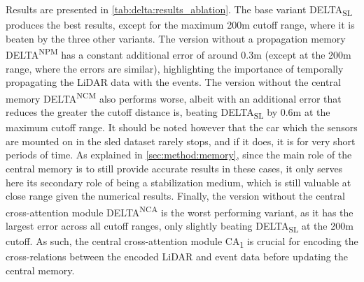 Results are presented in \cref{tab:delta:results_ablation}. The base variant DELTA\textsubscript{SL} produces the best results, except for the maximum 200m cutoff range, where it is beaten by the three other variants. The version without a propagation memory DELTA\textsuperscript{NPM} has a constant additional error of around 0.3m (except at the 200m range, where the errors are similar), highlighting the importance of temporally propagating the LiDAR data with the events. The version without the central memory DELTA\textsuperscript{NCM} also performs worse, albeit with an additional error that reduces the greater the cutoff distance is, beating DELTA\textsubscript{SL} by 0.6m at the maximum cutoff range. It should be noted however that the car which the sensors are mounted on in the \acrshort{sled} dataset rarely stops, and if it does, it is for very short periods of time. As explained in \cref{sec:method:memory}, since the main role of the central memory is to still provide accurate results in these cases, it only serves here its secondary role of being a stabilization medium, which is still valuable at close range given the numerical results. Finally, the version without the central cross-attention module DELTA\textsuperscript{NCA} is the worst performing variant, as it has the largest error across all cutoff ranges, only slightly beating DELTA\textsubscript{SL} at the 200m cutoff. As such, the central cross-attention module CA\textsubscript{1} is crucial for encoding the cross-relations between the encoded LiDAR and event data before updating the central memory.


